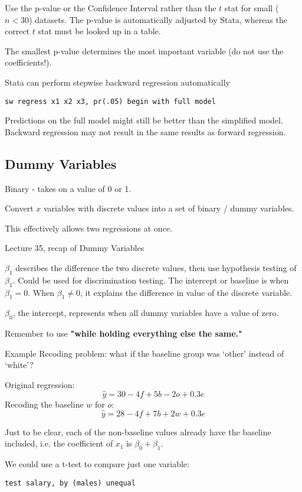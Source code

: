 \documentclass[11pt, oneside]{article}   	%
\begin{document}
Use the p-value or the Confidence Interval rather than the $t$ stat for small ($n < 30$) datasets. The p-value is automatically adjusted by Stata, whereas the correct $t$ stat must be looked up in a table.

The smallest p-value determines the most important variable (do not use the coefficients!).

Stata can perform stepwise backward regression automatically
\begin{verbatim}
sw regress x1 x2 x3, pr(.05) begin with full model
\end{verbatim}

Predictions on the full model might still be better than the simplified model. Backward regression may not result in the same results as forward regression.

\subsection{Dummy Variables}

Binary - takes on a value of 0 or 1.

Convert $x$ variables with discrete values into a set of binary / dummy variables.

This effectively allows two regressions at once.

Lecture 35, recap of Dummy Variables

$\beta_1$ describes the difference the two discrete values, then use hypothesis testing of $\beta_1$. Could be used for discrimination testing. The intercept or baseline is when $\beta_1 = 0$. When $\beta_1 \neq 0$, it explains the difference in value of the discrete variable.

$\beta_0$, the intercept, represents when all dummy variables have a value of zero.

Remember to use \textbf{"while holding everything else the same."}

Example Recoding problem: what if the baseline group was `other' instead of `white'? 

Original regression:
\[
\hat{y} = 30 -4 f + 5 b - 2 o + 0.3 e
\]
Recoding the baseline $w$ for $o$:
\[
\hat{y} = 28 -4 f + 7 b + 2 w + 0.3 e
\]

Just to be clear, each of the non-baseline values already have the baseline included, i.e. the coefficient of $x_1$ is $\beta_0 + \beta_1$.

We could use a t-test to compare just one variable:
\begin{verbatim}
test salary, by (males) unequal
\end{verbatim}
\end{document}
